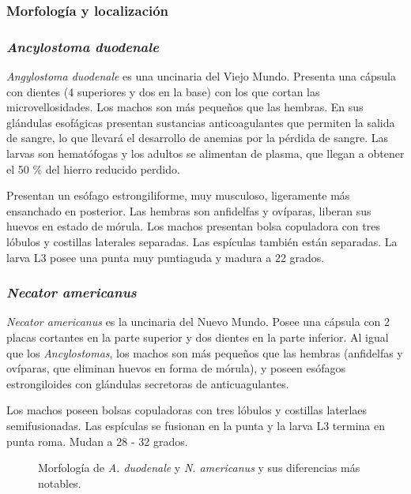 \subsubsection{Morfología y localización}
\begin{multicols}{2}
	\subsubsection*{\textit{Ancylostoma duodenale}}
	\textit{Angylostoma duodenale} es una uncinaria del Viejo Mundo. Presenta una cápsula con dientes (4 superiores y dos en la base) con los que cortan las microvellosidades. Los machos son más pequeños que las hembras. En sus glándulas esofágicas presentan sustancias anticoagulantes que permiten la salida de sangre, lo que llevará el desarrollo de anemias por la pérdida de sangre. Las larvas son hematófogas y los adultos se alimentan de plasma, que llegan a obtener el 50 \% del hierro reducido perdido.
	
	Presentan un esófago estrongiliforme, muy musculoso, ligeramente más ensanchado en posterior. Las hembras son anfidelfas y ovíparas, liberan sus huevos en estado de mórula. Los machos presentan bolsa copuladora con tres lóbulos y costillas laterales separadas. Las espículas también están separadas. La larva L3 posee una punta muy puntiaguda y madura a 22 grados.
	\columnbreak
	\subsubsection*{\textit{Necator americanus}}
	\textit{Necator americanus} es la uncinaria del Nuevo Mundo. Posee una cápsula con 2 placas cortantes en la parte superior y dos dientes en la parte inferior.  Al igual que los \textit{Ancylostomas}, los machos son más pequeños que las hembras (anfidelfas y ovíparas, que eliminan huevos en forma de mórula), y poseen esófagos estrongiloides con glándulas secretoras de anticuagulantes.
	
	Los machos poseen bolsas copuladoras  con tres lóbulos y costillas laterlaes semifusionadas. Las espículas se fusionan en la punta y la larva L3 termina en punta roma. Mudan a 28 - 32 grados.
\end{multicols}
\vspace*{-1cm}
\begin{figure}[H]
	\centering
	\caption[Morfología de \textit{A. duodenale} y \textit{N. americanus}]{Morfología de \textit{A. duodenale} y \textit{N. americanus} y sus diferencias más notables.}
\end{figure}
